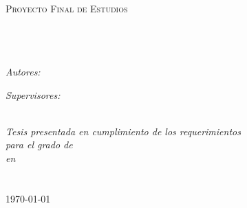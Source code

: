 \documentclass[10pt, oneside]{Thesis} %
\begin{document}
\begin{titlepage}
\begin{center}

\textsc{\LARGE \univname}\\[1.5cm] %
\textsc{\Large Proyecto Final de Estudios}\\[0.5cm] %

\HRule \\[0.4cm] %
{\huge \bfseries \ttitle}\\[0.4cm] %
\HRule \\[1.5cm] %
 
\begin{minipage}{0.4\textwidth}
\begin{flushleft} \large
\emph{Autores:}\\
{\authornames} %
\end{flushleft}
\end{minipage}
\begin{minipage}{0.4\textwidth}
\begin{flushright} \large
\emph{Supervisores:} \\
{\supname} %
\end{flushright}
\end{minipage}\\[3cm]
 
\large \textit{Tesis presentada en cumplimiento de los requerimientos\\ para el grado de \degreename}\\[0.3cm] %
\textit{en}\\[0.4cm]
\facname\\\univname\\[2cm] %
 
{\large \today}\\[4cm] %
 
\vfill
\end{center}

\end{titlepage}

\end{document}
